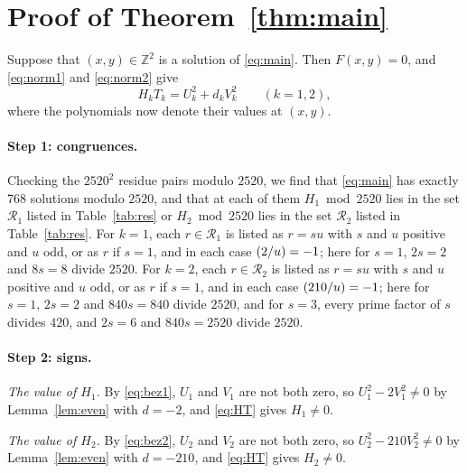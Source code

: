 \documentclass[11pt]{article}
\newcommand{\Z}{\mathbb{Z}}
\newcommand{\leg}[2]{\mathchoice{\biggl(\dfrac{#1}{#2}\biggr)}{(#1/#2)}{(#1/#2)}{(#1/#2)}}
\begin{document}
\section{Proof of Theorem~\ref{thm:main}}

Suppose that $(x,y)\in\Z^2$ is a solution of \eqref{eq:main}. Then $F(x,y)=0$, and \eqref{eq:norm1} and \eqref{eq:norm2} give
\begin{equation}\label{eq:HT}
H_kT_k=U_k^2+d_kV_k^2\qquad(k=1,2),
\end{equation}
where the polynomials now denote their values at $(x,y)$.

\paragraph{Step 1: congruences.} Checking the $2520^2$ residue pairs modulo $2520$, we find that \eqref{eq:main} has exactly 768 solutions modulo $2520$, and that at each of them $H_{1}\bmod 2520$ lies in the set $\mathcal R_{1}$ listed in Table~\ref{tab:res} or $H_{2}\bmod 2520$ lies in the set $\mathcal R_{2}$ listed in Table~\ref{tab:res}. For $k=1$, each $r\in\mathcal R_{1}$ is listed as $r=su$ with $s$ and $u$ positive and $u$ odd, or as $r$ if $s=1$, and in each case $\leg{2}{u}=-1$; here for $s=1$, $2s=2$ and $8s=8$ divide $2520$. For $k=2$, each $r\in\mathcal R_{2}$ is listed as $r=su$ with $s$ and $u$ positive and $u$ odd, or as $r$ if $s=1$, and in each case $\leg{210}{u}=-1$; here for $s=1$, $2s=2$ and $840s=840$ divide $2520$, and for $s=3$, every prime factor of $s$ divides $420$, and $2s=6$ and $840s=2520$ divide $2520$.

\paragraph{Step 2: signs.} \emph{The value of $H_{1}$.} By \eqref{eq:bez1}, $U_{1}$ and $V_{1}$ are not both zero, so $U_{1}^2-2V_{1}^2\neq0$ by Lemma~\ref{lem:even} with $d=-2$, and \eqref{eq:HT} gives $H_{1}\neq0$.

\emph{The value of $H_{2}$.} By \eqref{eq:bez2}, $U_{2}$ and $V_{2}$ are not both zero, so $U_{2}^2-210V_{2}^2\neq0$ by Lemma~\ref{lem:even} with $d=-210$, and \eqref{eq:HT} gives $H_{2}\neq0$.
\end{document}
